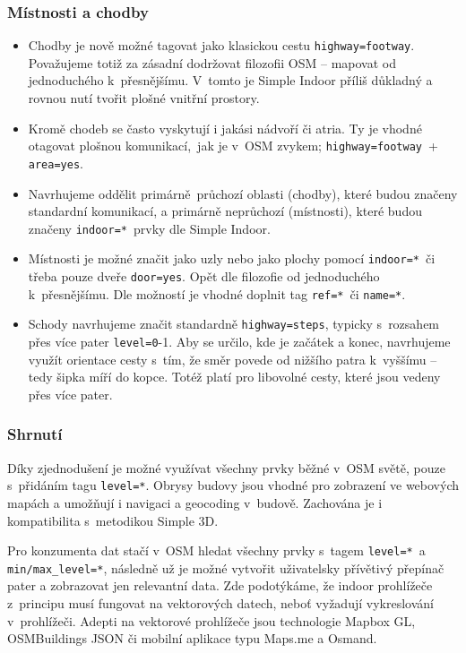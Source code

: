 \subsubsection*{Místnosti a chodby}\label{muxedstnosti-a-chodby}

\begin{itemize}

\item
  Chodby je nově možné tagovat jako klasickou cestu \texttt{highway=footway}. Považujeme totiž za zásadní dodržovat filozofii OSM -- mapovat od jednoduchého k~přesnějšímu. V~tomto je Simple Indoor příliš důkladný a rovnou nutí tvořit plošné vnitřní prostory.
\item
  Kromě chodeb se často vyskytují i jakási nádvoří či atria. Ty je vhodné otagovat plošnou komunikací,~jak je v~OSM zvykem; \texttt{highway=footway}~+ \texttt{area=yes}.
\item
  Navrhujeme oddělit primárně~průchozí oblasti (chodby), které budou značeny standardní komunikací, a primárně neprůchozí (místnosti), které budou značeny \texttt{indoor=*}~prvky dle Simple Indoor.
\item
  Místnosti je možné značit jako uzly nebo jako plochy pomocí \texttt{indoor=*}~či třeba pouze dveře \texttt{door=yes}. Opět dle filozofie od jednoduchého k~přesnějšímu. Dle možností je vhodné doplnit tag \texttt{ref=*}~či \texttt{name=*}.
\item
  Schody navrhujeme značit standardně \texttt{highway=steps}, typicky s~rozsahem přes více pater \texttt{level=0}-1. Aby se určilo, kde je začátek a konec, navrhujeme využít orientace cesty s~tím, že směr povede od nižšího patra k~vyššímu -- tedy šipka míří do kopce. Totéž platí pro libovolné cesty, které jsou vedeny přes více pater.
\end{itemize}

\subsubsection*{Shrnutí}\label{shrnutuxed}

Díky zjednodušení je možné využívat všechny prvky běžné v~OSM světě, pouze s~přidáním tagu \texttt{level=*}. Obrysy budovy jsou vhodné pro zobrazení ve webových mapách a umožňují i navigaci a geocoding v~budově. Zachována je i kompatibilita s~metodikou Simple 3D.

Pro konzumenta dat stačí v~OSM hledat všechny prvky s~tagem \texttt{level=*}~a \texttt{min/max\_level=*}, následně už je možné vytvořit uživatelsky přívětivý přepínač pater a zobrazovat jen relevantní data. Zde podotýkáme, že indoor prohlížeče z~principu musí fungovat na vektorových datech, neboť vyžadují vykreslování v~prohlížeči. Adepti na vektorové prohlížeče jsou technologie Mapbox GL, OSMBuildings JSON či mobilní aplikace typu Maps.me a Osmand.

